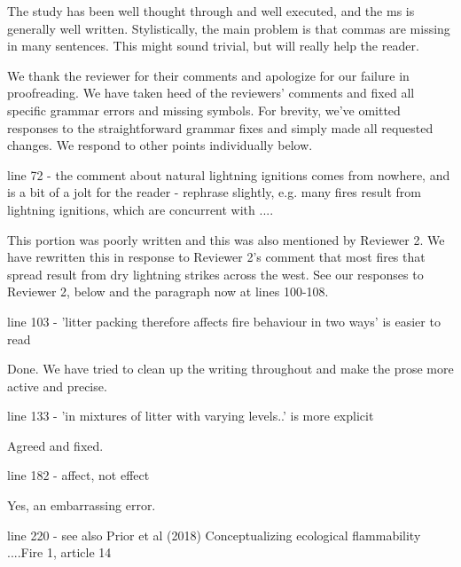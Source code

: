 \documentclass[letterpaper, 12pt]{letter}
\begin{document}
\begin{letter}{}
\begin{quoting}
  The study has been well thought through and well executed, and the ms is
  generally well written. Stylistically, the main problem is that commas are
  missing in many sentences. This might sound trivial, but will really help the
  reader.
\end{quoting}

We thank the reviewer for their comments and apologize for our failure in
proofreading. We have taken heed of the reviewers' comments and fixed all
specific grammar errors and missing symbols. For brevity, we've omitted
responses to the straightforward grammar fixes and simply made all requested
changes. We respond to other points individually below.

\begin{quoting}
  line 72 - the comment about natural lightning ignitions comes from nowhere,
  and is a bit of a jolt for the reader - rephrase slightly, e.g. many fires
  result from lightning ignitions, which are concurrent with ....
\end{quoting}

This portion was poorly written and this was also mentioned by Reviewer 2. We
have rewritten this in response to Reviewer 2's comment that most fires that
spread result from dry lightning strikes across the west. See our responses to
Reviewer 2, below and the paragraph now at lines 100-108.

\begin{quoting}
  line 103 - 'litter packing therefore affects fire behaviour in two ways' is
  easier to read
\end{quoting}

Done. We have tried to clean up the writing throughout and make the prose more
active and precise.

\begin{quoting}
  line 133 - 'in mixtures of litter with varying levels..' is more explicit
\end{quoting}

Agreed and fixed.

\begin{quoting}
line 182 - affect, not effect
\end{quoting}

Yes, an embarrassing error.

\begin{quoting}
  line 220 - see also Prior et al (2018) Conceptualizing ecological
  flammability ....Fire 1, article 14
\end{quoting}


\end{letter}
\end{document}
